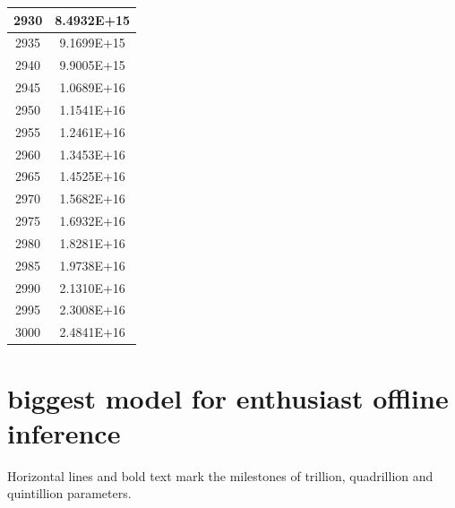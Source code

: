 \documentclass[a4paper]{article}
\begin{document}
\begin{tabular}{| c | c |}
    	2930 & 8.4932E+15 \\\hline
    	2935 & 9.1699E+15 \\\hline
    	2940 & 9.9005E+15 \\\hline
    	2945 & 1.0689E+16 \\\hline
    	2950 & 1.1541E+16 \\\hline
    	2955 & 1.2461E+16 \\\hline
    	2960 & 1.3453E+16 \\\hline
    	2965 & 1.4525E+16 \\\hline
    	2970 & 1.5682E+16 \\\hline
    	2975 & 1.6932E+16 \\\hline
    	2980 & 1.8281E+16 \\\hline
    	2985 & 1.9738E+16 \\\hline
    	2990 & 2.1310E+16 \\\hline
    	2995 & 2.3008E+16 \\\hline
    	3000 & 2.4841E+16 \\\hline
    \end{tabular}
    
    \normalsize
    
    \pagebreak
    
    \section{biggest model for enthusiast offline inference}
    
    Horizontal lines and bold text mark the milestones of trillion, quadrillion and quintillion parameters.
    
\end{document}
